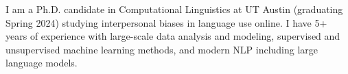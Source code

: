 I am a Ph.D. candidate in Computational Linguistics at UT Austin (graduating Spring 2024) studying interpersonal biases in language use online. I have 5+ years of experience with large-scale data analysis and modeling, supervised and unsupervised machine learning methods, and modern NLP  including large language models.
%

